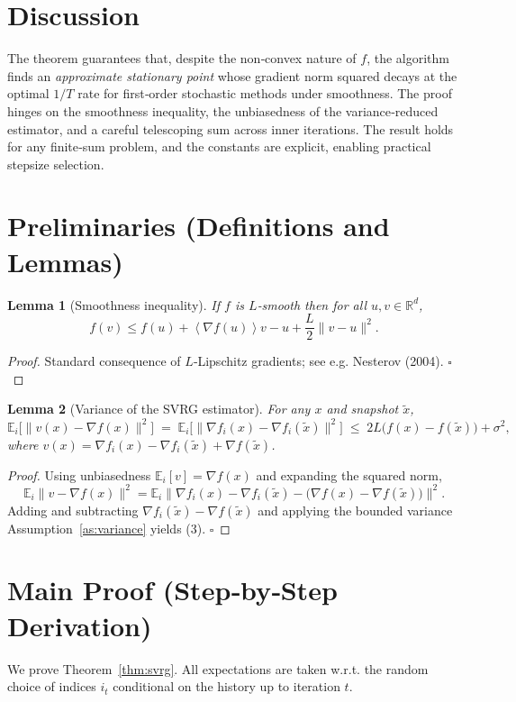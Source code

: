 \documentclass[11pt]{article}
\newtheorem{lemma}{Lemma}
\newcommand{\EE}{\mathbb{E}}
\newcommand{\RR}{\mathbb{R}}
\newcommand{\inner}[1]{\left\langle #1\right\rangle}
\newcommand{\grad}{\nabla}
\begin{document}
\section*{Discussion}
The theorem guarantees that, despite the non‑convex nature of $f$, the algorithm finds an \emph{approximate stationary point} whose gradient norm squared decays at the optimal $1/T$ rate for first‑order stochastic methods under smoothness. The proof hinges on the smoothness inequality, the unbiasedness of the variance‑reduced estimator, and a careful telescoping sum across inner iterations. The result holds for any finite‑sum problem, and the constants are explicit, enabling practical stepsize selection.

\newpage
\section*{Preliminaries (Definitions and Lemmas)}
\begin{lemma}[Smoothness inequality]\label{lem:smooth}
If $f$ is $L$‑smooth then for all $u,v\in\RR^{d}$,
\[
f(v)\le f(u)+\inner{\grad f(u)}{v-u}+\frac{L}{2}\|v-u\|^{2}.
\tag{2}
\]
\end{lemma}
\begin{proof}
Standard consequence of $L$‑Lipschitz gradients; see e.g. Nesterov (2004). \hfill $\square$
\end{proof}
\begin{lemma}[Variance of the SVRG estimator]\label{lem:var}
For any $x$ and snapshot $\tilde{x}$,
\[
\EE_{i}\!\big[\|v(x)-\grad f(x)\|^{2}\big]
\;=\;
\EE_{i}\!\big[\|\grad f_i(x)-\grad f_i(\tilde{x})\|^{2}\big]
\;\le\;
2L\big(f(x)-f(\tilde{x})\big)+\sigma^{2},
\tag{3}
\]
where $v(x)=\grad f_i(x)-\grad f_i(\tilde{x})+\grad f(\tilde{x})$.
\end{lemma}
\begin{proof}
Using unbiasedness $\EE_i[v]=\grad f(x)$ and expanding the squared norm,
\[
\EE_i\|v-\grad f(x)\|^{2}
=\EE_i\|\grad f_i(x)-\grad f_i(\tilde{x})-\big(\grad f(x)-\grad f(\tilde{x})\big)\|^{2}.
\]
Adding and subtracting $\grad f_i(\tilde{x})-\grad f(\tilde{x})$ and applying the bounded variance Assumption~\ref{as:variance} yields (3). \hfill $\square$
\end{proof}

\section*{Main Proof (Step‑by‑Step Derivation)}
We prove Theorem~\ref{thm:svrg}.  
All expectations are taken w.r.t. the random choice of indices $i_t$ conditional on the history up to iteration $t$.
\end{document}
